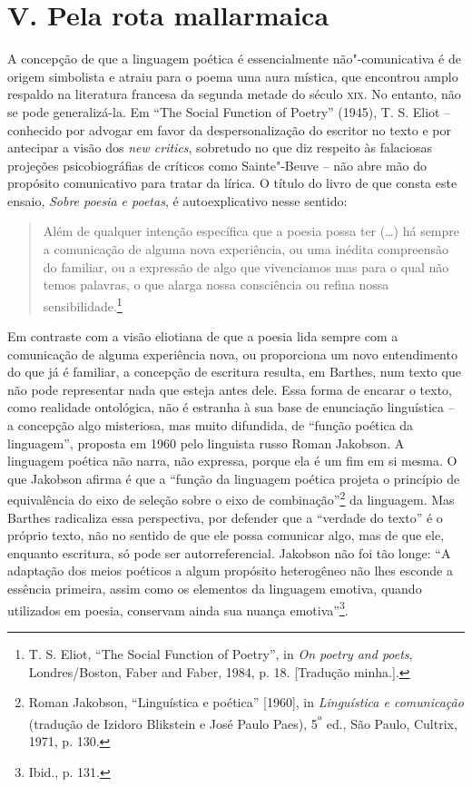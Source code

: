\section*{V. Pela rota mallarmaica}

A concepção de que a linguagem poética é essencialmente não"-comunicativa
é de origem simbolista e atraiu para o poema uma aura mística, que
encontrou amplo respaldo na literatura francesa da segunda metade do
século \textsc{xix}. No entanto, não se pode generalizá-la. Em ``The
Social Function of Poetry'' (1945), T. S. Eliot -- conhecido por advogar
em favor da despersonalização do escritor no texto e por antecipar a
visão dos \emph{new critics}, sobretudo no que diz respeito às
falaciosas projeções psicobiográfias de críticos como Sainte"-Beuve --
não abre mão do propósito comunicativo para tratar da lírica. O título
do livro de que consta este ensaio, \emph{Sobre poesia e poetas}, é
autoexplicativo nesse sentido:

\begin{quote}
Além de qualquer intenção específica que a poesia possa ter (\ldots{}) há
sempre a comunicação de alguma nova experiência, ou uma inédita
compreensão do familiar, ou a expressão de algo que vivenciamos mas para
o qual não temos palavras, o que alarga nossa consciência ou refina
nossa sensibilidade.\footnote{T. S. Eliot, ``The Social Function of
  Poetry'', in \emph{On poetry and poets}, Londres/Boston, Faber and
  Faber, 1984, p. 18. {[}Tradução minha.{]}.}
\end{quote}

Em contraste com a visão eliotiana de que a poesia lida sempre com a
comunicação de alguma experiência nova, ou proporciona um novo
entendimento do que já é familiar, a concepção de escritura resulta, em
Barthes, num texto que não pode representar nada que esteja antes dele.
Essa forma de encarar o texto, como realidade ontológica, não é estranha
à sua base de enunciação linguística -- a concepção algo misteriosa, mas
muito difundida, de ``função poética da linguagem'', proposta em 1960
pelo linguista russo Roman Jakobson. A linguagem poética não narra, não
expressa, porque ela é um fim em si mesma. O que Jakobson afirma é que a
``função da linguagem poética projeta o princípio de equivalência do
eixo de seleção sobre o eixo de combinação''\footnote{Roman Jakobson,
  ``Linguística e poética'' {[}1960{]}, in \emph{Linguística e
  comunicação} (tradução de Izidoro Blikstein e José Paulo Paes),
  5\textsuperscript{ª} ed., São Paulo, Cultrix, 1971, p. 130.} da
linguagem. Mas Barthes radicaliza essa perspectiva, por defender que a
``verdade do texto'' é o próprio texto, não no sentido de que ele possa
comunicar algo, mas de que ele, enquanto escritura, só pode ser
autorreferencial. Jakobson não foi tão longe: ``A adaptação dos meios
poéticos a algum propósito heterogêneo não lhes esconde a essência
primeira, assim como os elementos da linguagem emotiva, quando
utilizados em poesia, conservam ainda sua nuança emotiva''\footnote{Ibid.,
  p. 131.}.

